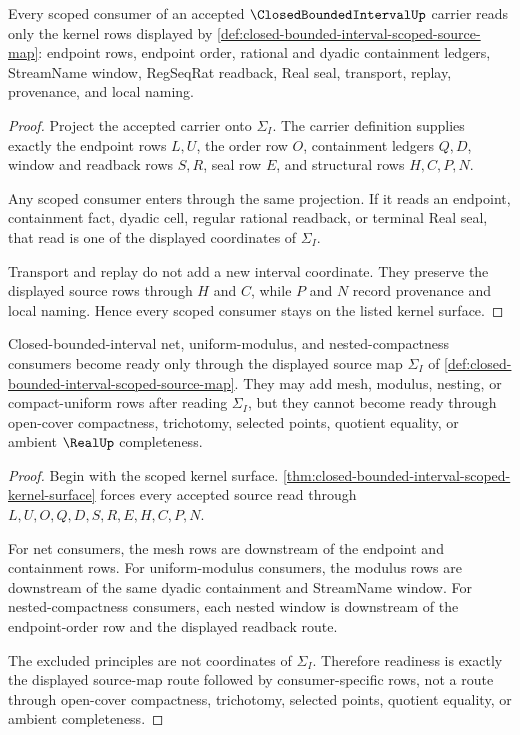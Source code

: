\begin{theorem}
\label{thm:closed-bounded-interval-scoped-kernel-surface}
Every scoped consumer of an accepted $\ClosedBoundedIntervalUp$ carrier reads only the kernel rows displayed by \autoref{def:closed-bounded-interval-scoped-source-map}: endpoint rows, endpoint order, rational and dyadic containment ledgers, StreamName window, RegSeqRat readback, Real seal, transport, replay, provenance, and local naming.
\end{theorem}
\begin{proof}
Project the accepted carrier onto $\Sigma_I$. The carrier definition supplies exactly the endpoint rows $L,U$, the order row $O$, containment ledgers $Q,D$, window and readback rows $S,R$, seal row $E$, and structural rows $H,C,P,N$.

Any scoped consumer enters through the same projection. If it reads an endpoint, containment fact, dyadic cell, regular rational readback, or terminal Real seal, that read is one of the displayed coordinates of $\Sigma_I$.

Transport and replay do not add a new interval coordinate. They preserve the displayed source rows through $H$ and $C$, while $P$ and $N$ record provenance and local naming. Hence every scoped consumer stays on the listed kernel surface.
\end{proof}

\begin{theorem}
\label{thm:closed-bounded-interval-net-consumer-readiness}
Closed-bounded-interval net, uniform-modulus, and nested-compactness consumers become ready only through the displayed source map $\Sigma_I$ of \autoref{def:closed-bounded-interval-scoped-source-map}. They may add mesh, modulus, nesting, or compact-uniform rows after reading $\Sigma_I$, but they cannot become ready through open-cover compactness, trichotomy, selected points, quotient equality, or ambient $\RealUp$ completeness.
\end{theorem}
\begin{proof}
Begin with the scoped kernel surface. \autoref{thm:closed-bounded-interval-scoped-kernel-surface} forces every accepted source read through $L,U,O,Q,D,S,R,E,H,C,P,N$.

For net consumers, the mesh rows are downstream of the endpoint and containment rows. For uniform-modulus consumers, the modulus rows are downstream of the same dyadic containment and StreamName window. For nested-compactness consumers, each nested window is downstream of the endpoint-order row and the displayed readback route.

The excluded principles are not coordinates of $\Sigma_I$. Therefore readiness is exactly the displayed source-map route followed by consumer-specific rows, not a route through open-cover compactness, trichotomy, selected points, quotient equality, or ambient completeness.
\end{proof}

